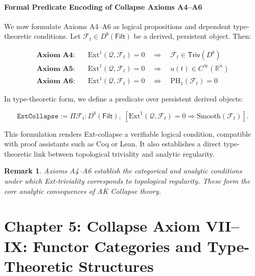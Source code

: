 \documentclass[11pt]{article}
\newtheorem{remark}[theorem]{Remark}
\begin{document}
\paragraph{Formal Predicate Encoding of Collapse Axioms A4–A6}

We now formulate Axioms A4–A6 as logical propositions and dependent type-theoretic conditions.  
Let \( \mathcal{F}_t \in D^b(\mathsf{Filt}) \) be a derived, persistent object. Then:

\begin{align*}
\textbf{Axiom A4:} \quad & \mathrm{Ext}^1(\mathcal{Q}, \mathcal{F}_t) = 0 
\quad \Rightarrow \quad \mathcal{F}_t \in \mathsf{Triv}(D^b) \\
\textbf{Axiom A5:} \quad & \mathrm{Ext}^1(\mathcal{Q}, \mathcal{F}_t) = 0 
\quad \Rightarrow \quad u(t) \in C^\infty(\mathbb{R}^n) \\
\textbf{Axiom A6:} \quad & \mathrm{Ext}^1(\mathcal{Q}, \mathcal{F}_t) = 0 
\quad \Leftrightarrow \quad \mathrm{PH}_1(\mathcal{F}_t) = 0
\end{align*}

In type-theoretic form, we define a predicate over persistent derived objects:

\[
\texttt{ExtCollapse} := \Pi \mathcal{F}_t : D^b(\mathsf{Filt}),\; 
\left[
\mathrm{Ext}^1(\mathcal{Q}, \mathcal{F}_t) = 0 \Rightarrow \mathrm{Smooth}(\mathcal{F}_t)
\right].
\]

This formulation renders Ext-collapse a verifiable logical condition, 
compatible with proof assistants such as Coq or Lean.  
It also establishes a direct type-theoretic link between topological triviality and analytic regularity.

\begin{remark}
Axioms A4–A6 establish the categorical and analytic conditions  
under which Ext-triviality corresponds to topological regularity.  
These form the core analytic consequences of AK Collapse theory.
\end{remark}



\section{Chapter 5: Collapse Axiom VII–IX: Functor Categories and Type-Theoretic Structures}
\end{document}
